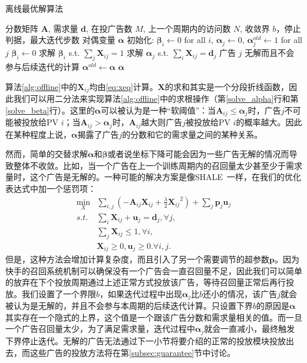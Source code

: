 \begin{algorithm}[tb]
	\caption{离线最优解算法} 
	\label{alg:offline}
	\begin{algorithmic}[1]
		\REQUIRE 分数矩阵 $\bm{A}$, 需求量 $\bm{d}$, 在投广告数 $M$, 上一个周期内的访问数 $N$, 收敛界 $b$，停止判据，最大迭代步数
		\ENSURE 对偶变量 $\bm{\alpha}$ 
		\STATE 初始化: $\bm{\beta}_i \leftarrow 0$ for all $i$, $\bm{\alpha}_j \leftarrow 0$, $\bm{\alpha}^{old}_j \leftarrow 1$ for all $j$
		\STATE $\bm{\beta}_i \leftarrow 0$
		\ELSE
		\STATE 求解 $\bm{\beta}_i$ s.t. $\sum_j \bm{X}_{ij} = 1$ \label{solve_beta}
		\ENDIF
		\ENDFOR
		\STATE 求解 $\bm{\alpha}_j$ s.t. $\sum_i \bm{X}_{ij} = \bm{d}_j$ \label{solve_alpha}
		\STATE 广告 $j$ 无解而且不会参与后续迭代的计算 \label{bound}
		\ENDIF
		\ENDFOR
		\STATE $\bm{\alpha}^{old} \leftarrow \bm{\alpha}$
		\ENDWHILE
		\RETURN $\bm{\alpha}$ 
	\end{algorithmic}
\end{algorithm}

算法\ref{alg:offline}中的$\bm{X}_{ij}$均由\eqref{eq:xeq}计算。$\bm{X}$的求和其实是一个分段折线函数，因此我们可以用二分法来实现算法\ref{alg:offline}中的求根操作（第\ref{solve_alpha}行和第\ref{solve_beta}行）。这里的$\bm{\alpha}$可以被认为是一种“软阈值”：当$\bm{A}_{ij} \le \bm{\alpha}_j$时，广告$j$不可能被投放给PV $i$；当$\bm{A}_{ij} > \bm{\alpha}_j$时，$\bm{A}_{ij}$越大则广告$j$被投放给PV $i$的概率越大。因此在某种程度上说，$\bm{\alpha}$揭露了广告$j$的分数和它的需求量之间的某种关系。

然而，简单的交替求解$\bm{\alpha}$和$\bm{\beta}$或者说坐标下降可能会因为一些广告无解的情况而导致整体不收敛。比如，当一个广告在上一个训练周期内的召回量太少甚至少于需求量时，这个广告是无解的。一种可能的解决方案是像SHALE~\cite{bharadwaj2012shale}一样，在我们的优化表达式中加一个惩罚项：
\begin{equation}
\begin{aligned}
\min_X &\sum_{i,j}  (-\bm{A}_{ij}\bm{X}_{ij} + \frac{\lambda}{2}{\bm{X}_{ij}}^2) + \sum_j \bm{p}_j\bm{u}_j  \\
s.t. & \sum_i \bm{X}_{ij} + \bm{u}_j = \bm{d}_j, \forall j, \\
& \sum_j \bm{X}_{ij} \le 1, \forall i, \\
& \bm{X}_{ij} \ge 0, \bm{u}_j \ge 0. \forall i, j. 
\end{aligned}
\end{equation}
但是，这种方法会增加计算复杂度，而且引入了另一个需要调节的超参数$\bm{p}$。因为快手的召回系统机制可以确保没有一个广告会一直召回量不足，因此我们可以简单的放弃在下个投放周期通过上述正常方式投放该广告，等待召回量正常后再行投放。我们设置了一个界限$b$，如果迭代过程中出现$\bm{\alpha}_j$比$b$还小的情况，该广告$j$就会被认为是无解的，并且不会参与本周期的后续迭代计算。只设置下界$b$的原因是$\bm{\alpha}$其实存在一个隐式的上界，这个值是一个跟该广告分数和需求量相关的值。而一旦一个广告召回量太少，为了满足需求量，迭代过程中$\bm{\alpha}_j$就会一直减小，最终触发下界停止迭代。无解的广告无法通过下一小节将要介绍的正常的投放模块投放出去，而这些广告的投放方法将在第\ref{subsec:guarantee}节中讨论。

